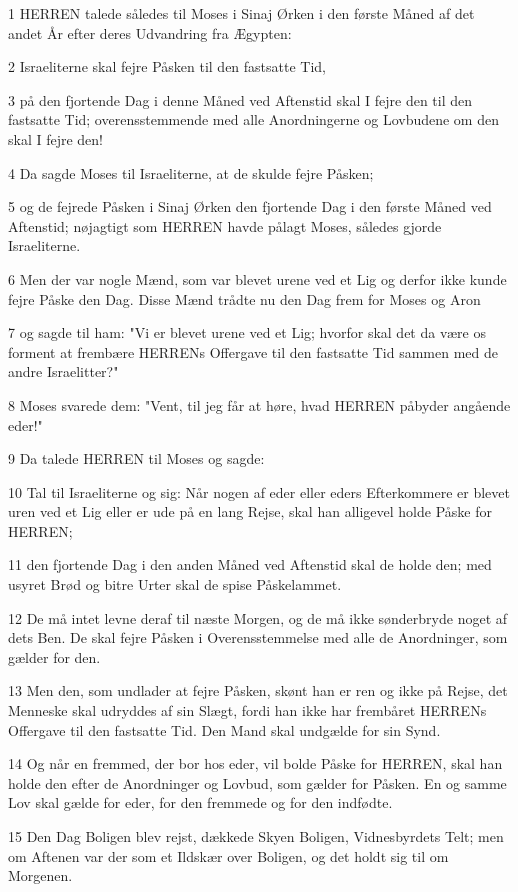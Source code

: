\par 1 HERREN talede således til Moses i Sinaj Ørken i den første Måned af det andet År efter deres Udvandring fra Ægypten:
\par 2 Israeliterne skal fejre Påsken til den fastsatte Tid,
\par 3 på den fjortende Dag i denne Måned ved Aftenstid skal I fejre den til den fastsatte Tid; overensstemmende med alle Anordningerne og Lovbudene om den skal I fejre den!
\par 4 Da sagde Moses til Israeliterne, at de skulde fejre Påsken;
\par 5 og de fejrede Påsken i Sinaj Ørken den fjortende Dag i den første Måned ved Aftenstid; nøjagtigt som HERREN havde pålagt Moses, således gjorde Israeliterne.
\par 6 Men der var nogle Mænd, som var blevet urene ved et Lig og derfor ikke kunde fejre Påske den Dag. Disse Mænd trådte nu den Dag frem for Moses og Aron
\par 7 og sagde til ham: "Vi er blevet urene ved et Lig; hvorfor skal det da være os forment at frembære HERRENs Offergave til den fastsatte Tid sammen med de andre Israelitter?"
\par 8 Moses svarede dem: "Vent, til jeg får at høre, hvad HERREN påbyder angående eder!"
\par 9 Da talede HERREN til Moses og sagde:
\par 10 Tal til Israeliterne og sig: Når nogen af eder eller eders Efterkommere er blevet uren ved et Lig eller er ude på en lang Rejse, skal han alligevel holde Påske for HERREN;
\par 11 den fjortende Dag i den anden Måned ved Aftenstid skal de holde den; med usyret Brød og bitre Urter skal de spise Påskelammet.
\par 12 De må intet levne deraf til næste Morgen, og de må ikke sønderbryde noget af dets Ben. De skal fejre Påsken i Overensstemmelse med alle de Anordninger, som gælder for den.
\par 13 Men den, som undlader at fejre Påsken, skønt han er ren og ikke på Rejse, det Menneske skal udryddes af sin Slægt, fordi han ikke har frembåret HERRENs Offergave til den fastsatte Tid. Den Mand skal undgælde for sin Synd.
\par 14 Og når en fremmed, der bor hos eder, vil bolde Påske for HERREN, skal han holde den efter de Anordninger og Lovbud, som gælder for Påsken. En og samme Lov skal gælde for eder, for den fremmede og for den indfødte.
\par 15 Den Dag Boligen blev rejst, dækkede Skyen Boligen, Vidnesbyrdets Telt; men om Aftenen var der som et Ildskær over Boligen, og det holdt sig til om Morgenen.
